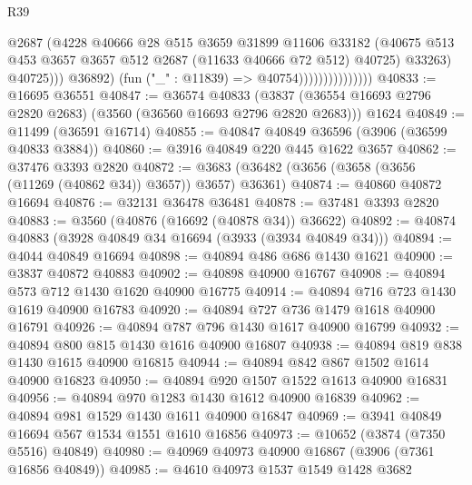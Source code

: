 \begin{lexlean}{R39}
\begin{coremodule}
                                        @2687
                                        (@4228
                                          @40666
                                          @28
                                          @515
                                          @3659
                                          @31899
                                          @11606
                                          @33182
                                          (@40675
                                            @513
                                            @453
                                            @3657
                                            @3657
                                            @512
                                            @2687
                                            (@11633 @40666 @72 @512)
                                            @40725)
                                          @33263)
                                        @40725)))
                                  @36892)
                                (fun ("_" : @11839) => @40754)))))))))))))))
@40833 := @16695 @36551
@40847 := @36574
    @40833
    (@3837 (@36554 @16693 @2796 @2820 @2683) (@3560 (@36560 @16693 @2796 @2820 @2683)))
    @1624
@40849 := @11499 (@36591 @16714)
@40855 := @40847 @40849 @36596 (@3906 (@36599 @40833 @3884))
@40860 := @3916 @40849 @220 @445 @1622 @3657
@40862 := @37476 @3393 @2820
@40872 := @3683 (@36482 (@3656 (@3658 (@3656 (@11269 (@40862 @34)) @3657)) @3657) @36361)
@40874 := @40860 @40872 @16694
@40876 := @32131 @36478 @36481
@40878 := @37481 @3393 @2820
@40883 := @3560 (@40876 (@16692 (@40878 @34)) @36622)
@40892 := @40874 @40883 (@3928 @40849 @34 @16694 (@3933 (@3934 @40849 @34)))
@40894 := @4044 @40849 @16694
@40898 := @40894 @486 @686 @1430 @1621
@40900 := @3837 @40872 @40883
@40902 := @40898 @40900 @16767
@40908 := @40894 @573 @712 @1430 @1620 @40900 @16775
@40914 := @40894 @716 @723 @1430 @1619 @40900 @16783
@40920 := @40894 @727 @736 @1479 @1618 @40900 @16791
@40926 := @40894 @787 @796 @1430 @1617 @40900 @16799
@40932 := @40894 @800 @815 @1430 @1616 @40900 @16807
@40938 := @40894 @819 @838 @1430 @1615 @40900 @16815
@40944 := @40894 @842 @867 @1502 @1614 @40900 @16823
@40950 := @40894 @920 @1507 @1522 @1613 @40900 @16831
@40956 := @40894 @970 @1283 @1430 @1612 @40900 @16839
@40962 := @40894 @981 @1529 @1430 @1611 @40900 @16847
@40969 := @3941 @40849 @16694 @567 @1534 @1551 @1610 @16856
@40973 := @10652 (@3874 (@7350 @5516) @40849)
@40980 := @40969 @40973 @40900 @16867 (@3906 (@7361 @16856 @40849))
@40985 := @4610 @40973 @1537 @1549 @1428 @3682

\end{coremodule}
\end{lexlean}

